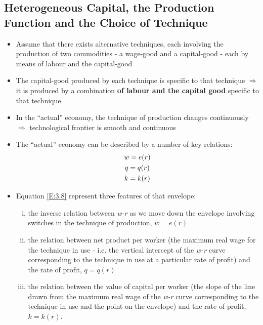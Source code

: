\documentclass[a4paper,twoside]{article}
\numberwithin{equation}{section}
\numberwithin{figure}{section}
\begin{document}
\subsection{Heterogeneous Capital, the Production Function and the Choice of Technique}
	\begin{itemize}
		\item  Assume that there exists alternative techniques, each involving the production of two commodities - a wage-good and a capital-good - each by means of labour and the capital-good 
		\item The capital-good produced by each technique is specific to that technique \(\Rightarrow\) it is produced by a combination \textbf{\textcolor{myred}{of labour and the capital good}} specific to that technique
		\item In the ``actual'' economy, the technique of production changes continuously \(\Rightarrow\) technological frontier is smooth and continuous
		\item The ``actual'' economy can be described by a number of key relations:
		\begin{gather}
			w = e(r) \notag\\
			q = q(r) \label{E:3.8}\\
			k = k(r) \notag 
		\end{gather}
		\item Equation \ref{E:3.8} represent three features of that envelope:
		\begin{enumerate}[(i)]
			\item the inverse relation between \textit{w-r} as we move down the envelope involving switches in the technique of production, \( w = e(r) \)
			\item the relation between net product per worker (the maximum real wage for the technique in use - i.e. the vertical intercept of the \textit{w-r} curve corresponding to the technique in use at a particular rate of profit) and the rate of profit, \( q = q(r) \)
			\item the relation between the value of capital per worker (the slope of the line drawn from the maximum real wage of the \textit{w-r} curve corresponding to the technique in use and the point on the envelope) and the rate of profit, \( k = k(r) \).
		\end{enumerate}
	\end{itemize}
\end{document}
